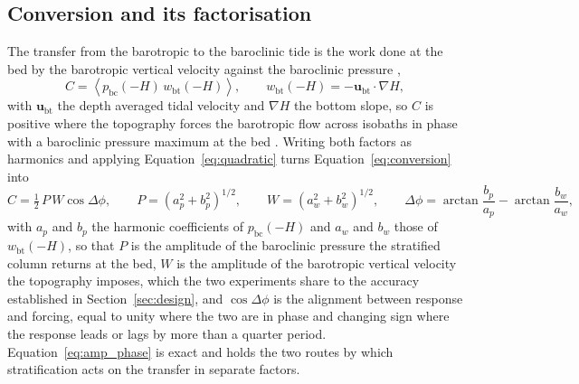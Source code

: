 \documentclass[a4paper,fleqn]{cas-sc}
\newcommand{\bc}{\mathrm{bc}}
\newcommand{\bt}{\mathrm{bt}}
\begin{document}
\subsection{Conversion and its factorisation}
\label{sec:energy}

The transfer from the barotropic to the baroclinic tide is the work done at the bed by the barotropic vertical velocity against the baroclinic pressure \citep{kurapov:2003,buijsman_2010},
\begin{equation}
C=\left\langle p_{\bc}(-H)\,w_{\bt}(-H)\right\rangle ,
\qquad
w_{\bt}(-H)=-\mathbf{u}_{\bt}\cdot\nabla H ,
\label{eq:conversion}
\end{equation}
with $\mathbf{u}_{\bt}$ the depth averaged tidal velocity and $\nabla H$ the bottom slope, so $C$ is positive where the topography forces the barotropic flow across isobaths in phase with a baroclinic pressure maximum at the bed \citep{kelly:2010,zilberman:2009}. Writing both factors as harmonics and applying Equation~\ref{eq:quadratic} turns Equation~\ref{eq:conversion} into
\begin{equation}
C=\tfrac{1}{2}\,P\,W\cos\Delta\phi ,
\qquad
P=\left(a_{p}^{2}+b_{p}^{2}\right)^{1/2} ,
\qquad
W=\left(a_{w}^{2}+b_{w}^{2}\right)^{1/2} ,
\qquad
\Delta\phi=\arctan\frac{b_{p}}{a_{p}}-\arctan\frac{b_{w}}{a_{w}} ,
\label{eq:amp_phase}
\end{equation}
with $a_{p}$ and $b_{p}$ the harmonic coefficients of $p_{\bc}(-H)$ and $a_{w}$ and $b_{w}$ those of $w_{\bt}(-H)$, so that $P$ is the amplitude of the baroclinic pressure the stratified column returns at the bed, $W$ is the amplitude of the barotropic vertical velocity the topography imposes, which the two experiments share to the accuracy established in Section~\ref{sec:design}, and $\cos\Delta\phi$ is the alignment between response and forcing, equal to unity where the two are in phase and changing sign where the response leads or lags by more than a quarter period. Equation~\ref{eq:amp_phase} is exact and holds the two routes by which stratification acts on the transfer in separate factors.
\end{document}
